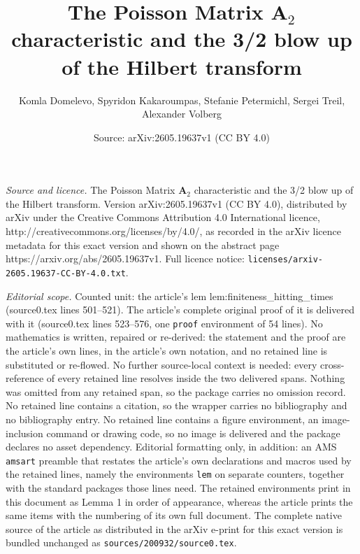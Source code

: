 \documentclass[10pt,a4paper]{amsart}
\title{The Poisson Matrix $\mathbf{A}_2$ characteristic and the 3/2 blow up of the Hilbert transform}
\author{Komla Domelevo, Spyridon Kakaroumpas, Stefanie Petermichl, Sergei Treil, Alexander Volberg}
\date{Source: arXiv:2605.19637v1 (CC BY 4.0)}
\begin{document}
\maketitle

\noindent\emph{Source and licence.} The Poisson Matrix $\mathbf{A}_2$ characteristic and the 3/2 blow up of the Hilbert transform. Version arXiv:2605.19637v1 (CC BY 4.0), distributed by arXiv under the Creative Commons Attribution 4.0 International licence, http://creativecommons.org/licenses/by/4.0/, as recorded in the arXiv licence metadata for this exact version and shown on the abstract page https://arxiv.org/abs/2605.19637v1. Full licence notice: \texttt{licenses/arxiv-2605.19637-CC-BY-4.0.txt}.\par\smallskip

\noindent\textit{Editorial scope.} Counted unit: the article's lem lem:finiteness\_hitting\_times (source0.tex lines 501--521). The article's complete original proof of it is delivered with it (source0.tex lines 523--576, one \texttt{proof} environment of 54 lines). No mathematics is written, repaired or re-derived: the statement and the proof are the article's own lines, in the article's own notation, and no retained line is substituted or re-flowed.  No further source-local context is needed: every cross-reference of every retained line resolves inside the two delivered spans.  Nothing was omitted from any retained span, so the package carries no omission record.  No retained line contains a citation, so the wrapper carries no bibliography and no bibliography entry.  No retained line contains a figure environment, an image-inclusion command or drawing code, so no image is delivered and the package declares no asset dependency.  Editorial formatting only, in addition: an AMS \texttt{amsart} preamble that restates the article's own declarations and macros used by the retained lines, namely the environments \texttt{lem} on separate counters, together with the standard packages those lines need.  The retained environments print in this document as Lemma 1 in order of appearance, whereas the article prints the same items with the numbering of its own full document.  The complete native source of the article as distributed in the arXiv e-print for this exact version is bundled unchanged as \texttt{sources/200932/source0.tex}.
\end{document}
